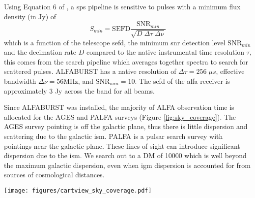 \documentclass[a4paper,fleqn,usenatbib]{mnras}
\begin{document}
Using Equation 6 of \cite{2015MNRAS.452.1254K}, a \gls*{sps} pipeline is
sensitive to pulses with a minimum flux density (in Jy) of
%
\begin{equation}
S_{min} = \textrm{SEFD} \frac{\textrm{SNR}_{min}}{\sqrt{D \; \Delta \tau \;
\Delta \nu}}
\end{equation}
%
which is a function of the telescope \gls*{sefd}, the minimum \gls*{snr}
detection level $\textrm{SNR}_{min}$ and the decimation rate $D$ compared to the
native instrumental time resolution $\tau$, this comes from the search pipeline
which averages together spectra to search for scattered pulses. ALFABURST has a
native resolution of $\Delta \tau = 256 \; \mu s$, effective bandwidth $\Delta
\nu = 56 \textrm{MHz}$, and $\textrm{SNR}_{min} = 10$. The \gls*{sefd} of the
\gls*{alfa} receiver is approximately 3 Jy across the band for all beams.



Since ALFABURST was installed, the majority of ALFA observation time is
allocated for the AGES \citep{2006MNRAS.371.1617A} and PALFA
\citep{2006ApJ...637..446C} surveys (Figure \ref{fig:sky_coverage}).  The AGES
survey pointing is off the galactic plane, thus there is little dispersion and
scattering due to the galactic \gls*{ism}. PALFA is a pulsar search survey with
pointings near the galactic plane. These lines of sight can introduce
significant dispersion due to the \gls*{ism}. We search out to a DM of 10000
which is well beyond the maximum galactic dispersion, even when \gls*{igm}
dispersion is accounted for from sources of cosmological distances.

\begin{figure*}
    \texttt{[image: figures/cartview\_sky\_coverage.pdf]}
    \caption{Sky coverage during ALFA usage between July 2015 and June 2017,
    shown in a Cartesian projection in galactic coordinates. Color represents
    total time pointing in a log scale. The majority of ALFA usage during this
    time was for the PALFA survey along the galactic plane (dot-dashed boxes)
    and the AGES survey (dashed box).  The S-shaped arcs across the plot are due
    to fixed pointings in local azimuth and altitude.
    }
    \label{fig:sky_coverage}
\end{figure*}


\end{document}
